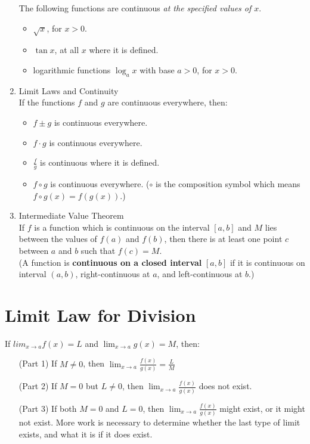 \begin{enumerate}
\begin{itemize}
        \end{itemize}
        The following functions are continuous \textit{at the specified values of $x$}.
        \begin{itemize}
            \item $\sqrt{x}$, for $x>0$.
            \item $\tan x$, at all $x$ where it is defined.
            \item logarithmic functions $\log_a x$ with base $a>0$, for $x>0$.
        \end{itemize}
    \item Limit Laws and Continuity \\
        If the functions $f$ and $g$ are continuous everywhere, then:
        \begin{itemize}
            \item $f\pm g$ is continuous everywhere.
            \item $f\cdot g$ is continuous everywhere.
            \item $\frac{f}{g}$ is continuous where it is defined.
            \item $f\circ g$ is continuous everywhere. ($\circ$ is the composition symbol which means $f\circ g(x)=f(g(x))$.)
        \end{itemize}
    \item Intermediate Value Theorem \\
        If $f$ is a function which is continuous on the interval $[a, b]$ and $M$ lies between the values of $f(a)$ and $f(b)$, then there is at least one point $c$ between $a$ and $b$ such that $f(c)=M$. \\
        (A function is \textbf{continuous on a closed interval} $[a, b]$ if it is continuous on interval $(a, b)$, right-continuous at $a$, and left-continuous at $b$.)
\end{enumerate}

\section{Limit Law for Division}
If $lim_{x\to a} f(x)=L$ and $\lim_{x\to a} g(x)=M$, then:
\begin{enumerate}
    \item[(Part 1)] If $M\neq 0$, then $\lim_{x\to a} \frac{f(x)}{g(x)}=\frac{L}{M}$
    \item[(Part 2)] If $M=0$ but $L\neq 0$, then $\lim_{x\to a} \frac{f(x)}{g(x)}$ does not exist.
    \item[(Part 3)] If both $M=0$ and $L=0$, then $\lim_{x\to a} \frac{f(x)}{g(x)}$ might exist, or it might not exist. More work is necessary to determine whether the last type of limit exists, and what it is if it does exist.
\end{enumerate}

